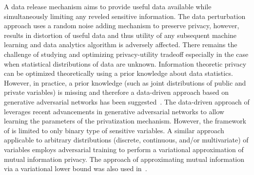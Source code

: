 \documentclass[a4paper,11pt]{article}
\begin{document}
A data release mechanism aims to provide useful data available while simultaneously limiting any reveled sensitive information. The data perturbation approach uses a random noise adding mechanism to preserve privacy, however, results in distortion of useful data and thus utility of any subsequent machine learning and data analytics algorithm is adversely affected. There remains the challenge of studying and optimizing privacy-utility tradeoff especially in the case when statistical distributions of data are unknown. Information theoretic privacy can be optimized theoretically using a prior knowledge about data statistics. However, in practice, a prior knowledge (such as joint distributions of public and private variables) is missing and therefore a data-driven approach based on generative adversarial networks has been suggested~\cite{Huang_2017}. The data-driven approach of \cite{Huang_2017} leverages recent advancements in generative adversarial networks to allow learning the parameters of the privatization mechanism. However, the framework of \cite{Huang_2017} is limited to only binary type of sensitive variables. A similar approach~\cite{8919758} applicable to arbitrary distributions (discrete, continuous, and/or multivariate) of variables employs adversarial training to perform a variational approximation of mutual information privacy. The approach of approximating mutual information via a variational lower bound was also used in~\cite{NIPS2016_6399}.         
\end{document}
